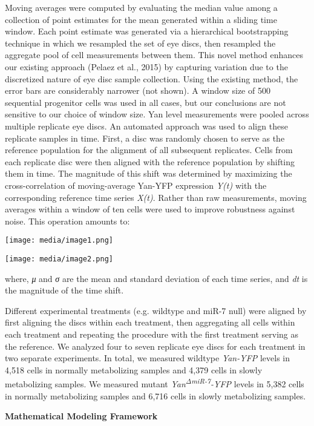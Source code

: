 Moving averages were computed by evaluating the median value among a collection of point estimates for the mean generated within a sliding time window. Each point estimate was generated via a hierarchical bootstrapping technique in which we resampled the set of eye discs, then resampled the aggregate pool of cell measurements between them. This novel method enhances our existing approach (Pelaez et al., 2015) by capturing variation due to the discretized nature of eye disc sample collection. Using the existing method, the error bars are considerably narrower (not shown). A window size of 500 sequential progenitor cells was used in all cases, but our conclusions are not sensitive to our choice of window size. Yan level measurements were pooled across multiple replicate eye discs. An automated approach was used to align these replicate samples in time. First, a disc was randomly chosen to serve as the reference population for the alignment of all subsequent replicates. Cells from each replicate disc were then aligned with the reference population by shifting them in time. The magnitude of this shift was determined by maximizing the cross-correlation of moving-average Yan-YFP expression \emph{Y(t)} with the corresponding reference time series \emph{X(t)}. Rather than raw measurements, moving averages within a window of ten cells were used to improve robustness against noise. This operation amounts to:

\texttt{[image: media/image1.png]}

\texttt{[image: media/image2.png]}

where, \emph{μ} and \emph{σ} are the mean and standard deviation of each time series, and \emph{dt} is the magnitude of the time shift.

Different experimental treatments (e.g. wildtype and miR-7 null) were aligned by first aligning the discs within each treatment, then aggregating all cells within each treatment and repeating the procedure with the first treatment serving as the reference. We analyzed four to seven replicate eye discs for each treatment in two separate experiments. In total, we measured wildtype \emph{Yan-YFP} levels in 4,518 cells in normally metabolizing samples and 4,379 cells in slowly metabolizing samples. We measured mutant \emph{Yan\textsuperscript{ΔmiR-7}-YFP} levels in 5,382 cells in normally metabolizing samples and 6,716 cells in slowly metabolizing samples.

\textbf{Mathematical Modeling Framework}

